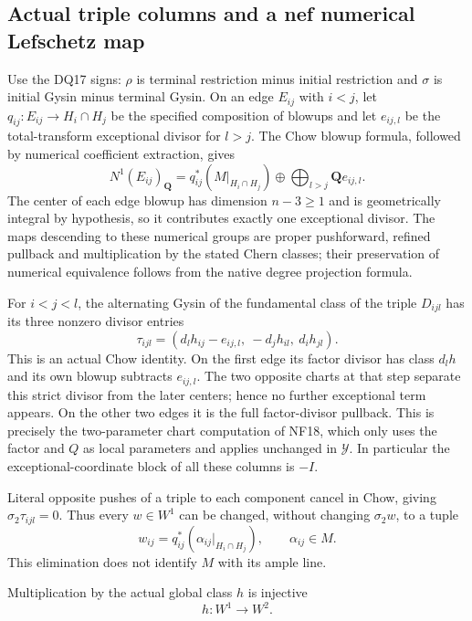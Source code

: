 \subsection{Actual triple columns and a nef numerical Lefschetz map}

Use the DQ17 signs: $\rho$ is terminal restriction minus initial
restriction and $\sigma$ is initial Gysin minus terminal Gysin.
On an edge $E_{ij}$ with $i<j$, let $q_{ij}:E_{ij}\to H_i\cap H_j$
be the specified composition of blowups and let $e_{ij,l}$ be the
total-transform exceptional divisor for $l>j$.  The Chow blowup
formula, followed by numerical coefficient extraction, gives
\[
       N^1(E_{ij})_{\mathbf Q}
          =q_{ij}^*(M|_{H_i\cap H_j})
                   \oplus\bigoplus_{l>j}\mathbf Qe_{ij,l}.
 \tag{PG18.9}\label{r18pg:edge-basis}
\]
The center of each edge blowup has dimension $n-3\ge1$ and is
geometrically integral by hypothesis, so it contributes exactly
one exceptional divisor.  The maps descending to these numerical
groups are proper pushforward, refined pullback and multiplication
by the stated Chern classes; their preservation of numerical
equivalence follows from the native degree projection formula.

For $i<j<l$, the alternating Gysin of the fundamental class of the
triple $D_{ijl}$ has its three nonzero divisor entries
\[
            \tau_{ijl}=(d_lh_{ij}-e_{ij,l},\ -d_jh_{il},\ d_ih_{jl}).
 \tag{PG18.10}\label{r18pg:triple-columns}
\]
This is an actual Chow identity.  On the first edge its factor
divisor has class $d_lh$ and its own blowup subtracts $e_{ij,l}$.
The two opposite charts at that step separate this strict divisor
from the later centers; hence no further exceptional term appears.
On the other two edges it is the full factor-divisor pullback.
This is precisely the two-parameter chart computation of NF18,
which only uses the factor and $Q$ as local parameters and applies
unchanged in $\mathcal Y$.  In particular the exceptional-coordinate
block of all these columns is $-I$.

Literal opposite pushes of a triple to each component cancel in
Chow, giving $\sigma_2\tau_{ijl}=0$.  Thus every $w\in W^1$ can
be changed, without changing $\sigma_2w$, to a tuple
\[
                        w_{ij}=q_{ij}^*(\alpha_{ij}|_{H_i\cap H_j}),
                         \qquad\alpha_{ij}\in M.
 \tag{PG18.11}\label{r18pg:base-tuple}
\]
This elimination does not identify $M$ with its ample line.

\begin{lemma}
\label{r18pg:nef-injective}
Multiplication by the actual global class $h$ is injective
\[
                             h:W^1\longrightarrow W^2.
 \tag{PG18.12}\label{r18pg:nef-map}
\]
\end{lemma}

